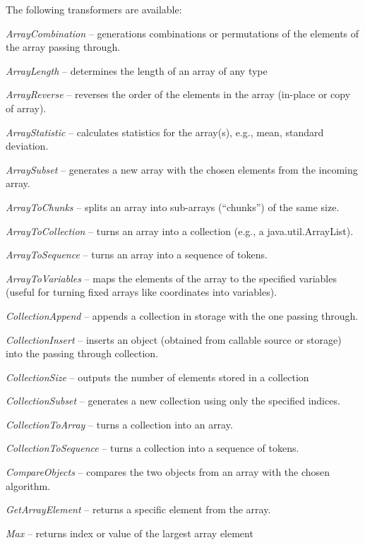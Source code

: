 \noindent The following transformers are available:
\begin{tight_itemize}
	\item \textit{ArrayCombination} -- generations combinations or permutations of
	the elements of the array passing through.
	\item \textit{ArrayLength} -- determines the length of an array of any type
	\item \textit{ArrayReverse} -- reverses the order of the elements in the array
	(in-place or copy of array).
	\item \textit{ArrayStatistic} -- calculates statistics for the array(s), e.g.,
	mean, standard deviation.
	\item \textit{ArraySubset} -- generates a new array with the chosen elements
	from the incoming array.
	\item \textit{ArrayToChunks} -- splits an array into sub-arrays (``chunks'')
	of the same size.
	\item \textit{ArrayToCollection} -- turns an array into a collection (e.g.,
	a java.util.ArrayList).
	\item \textit{ArrayToSequence} -- turns an array into a sequence of tokens.
	\item \textit{ArrayToVariables} -- maps the elements of the array to the
	specified variables (useful for turning fixed arrays like coordinates into variables).
	\item \textit{CollectionAppend} -- appends a collection in storage with the
	one passing through.
	\item \textit{CollectionInsert} -- inserts an object (obtained from callable
	source or storage) into the passing through collection.
  \item \textit{CollectionSize} -- outputs the number of elements stored in a collection
	\item \textit{CollectionSubset} -- generates a new collection using only the
	specified indices.
	\item \textit{CollectionToArray} -- turns a collection into an array.
	\item \textit{CollectionToSequence} -- turns a collection into a sequence of
	tokens.
	\item \textit{CompareObjects} -- compares the two objects from an array
	with the chosen algorithm.
	\item \textit{GetArrayElement} -- returns a specific element from the array.
	\item \textit{Max} -- returns index or value of the largest array element

\end{tight_itemize}
